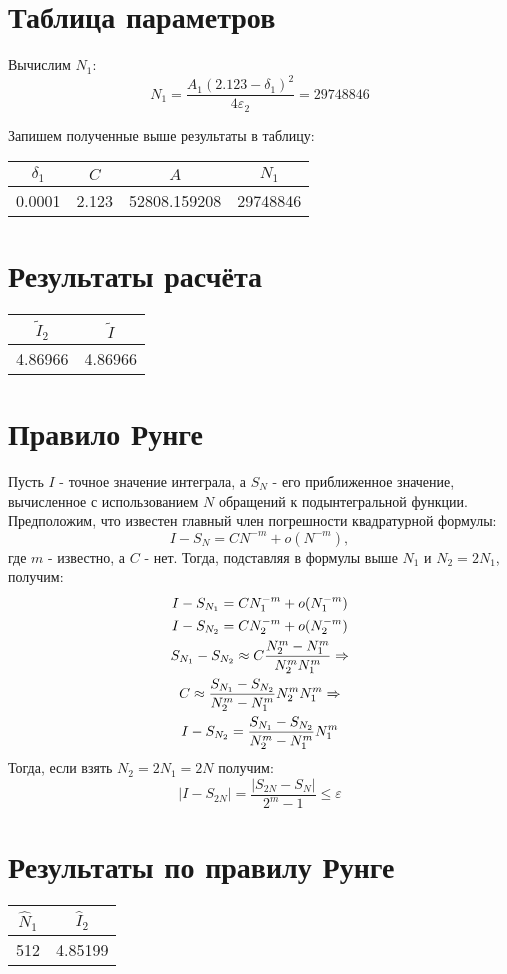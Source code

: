 \documentclass[titlepage]{article}
\def\l{\left}
\def\r{\right}
\def\le{\leqslant}
\begin{document}
\section{Таблица параметров}
Вычислим $N_1$:
$$N_1 = \frac{A_1(2.123-\delta_1)^2}{4\varepsilon_2} = 29748846$$

Запишем полученные выше результаты в таблицу:
\begin{center}
	\begin{tabular}{|c|c|c|c|}
		\hline
		$\delta_1$ &  $C$ & $A$ &  $N_1$  \\
		\hline
		0.0001 & 2.123 & 52808.159208 & 29748846 \\
		\hline
	\end{tabular}
\end{center}
\section{Результаты расчёта}
\begin{center}
	\begin{tabular}{|c|c|}
		\hline
		$\tilde I_2$  & $\tilde I$\\
		\hline
		4.86966 & 4.86966 \\
		\hline
	\end{tabular}
\end{center}

\section{Правило Рунге}
Пусть $I$ - точное значение интеграла, а $S_N$ - его приближенное значение, вычисленное с использованием $N$ обращений к подынтегральной функции. Предположим, что известен главный член погрешности квадратурной формулы:
$$I - S_N = CN^{-m} + o(N^{-m}),$$
где $m$ - известно, а $C$ - нет. Тогда, подставляя в формулы выше $N_1$ и $N_2 = 2N_1$, получим:
\begin{gather}
	\notag I - S_{N_1} = CN_1^{-m} + o(N_1^{-m}) \\
	\notag I - S_{N_2} = CN_2^{-m} + o(N_2^{-m}) \\
	\notag S_{N_1} - S_{N_2} \approx C \frac{N_2^m - N_1^m}{N_2^m N_1^m} \Rightarrow \\
	\notag C \approx \frac{S_{N_1} - S_{N_2}}{N_2^m - N_1^m}N_2^m N_1^m \Rightarrow \\
	\notag I - S_{N_2} = \frac{S_{N_1} - S_{N_2}}{N_2^m - N_1^m}N_1^m
\end{gather}
Тогда, если взять $N_2 = 2N_1 = 2N$ получим:
$$\l| I - S_{2N} \r| = \frac{\l| S_{2N} - S_N \r|}{2^m - 1} \le \varepsilon$$

\section{Результаты по правилу Рунге}
\begin{center}
	\begin{tabular}{|c|c|}
		\hline
		$\hat N_1$ & $\hat I_2$  \\
		\hline
		512 & 4.85199  \\
		\hline
	\end{tabular}
\end{center}
\end{document}
